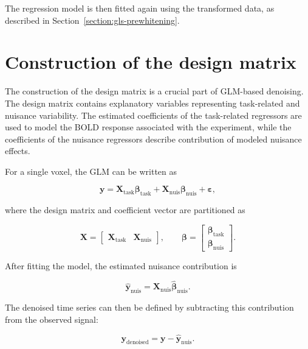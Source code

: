 \documentclass[english]{pwr_wmat_praca_dyplomowa}
\theoremstyle{definition}
\theoremstyle{remark}
\begin{document}
The regression model is then fitted again using the transformed data, as described in Section~\ref{section:gls-prewhitening}.


\section{Construction of the design matrix}
\label{section:design-matrix}

The construction of the design matrix is a crucial part of GLM-based denoising. The design matrix contains explanatory variables representing task-related and nuisance variability. The estimated coefficients of the task-related regressors are used to model the BOLD response associated with the experiment, while the coefficients of the nuisance regressors describe contribution of modeled nuisance effects.

For a single voxel, the GLM can be written as

\begin{equation}
    \mathbf{y} = \mathbf{X}_{\mathrm{task}} \boldsymbol{\beta}_{\mathrm{task}} + \mathbf{X}_{\mathrm{nuis}} \boldsymbol{\beta}_{\mathrm{nuis}} + \boldsymbol{\varepsilon},
\end{equation}

where the design matrix and coefficient vector are partitioned as

\begin{equation}
    \mathbf{X} =
    \begin{bmatrix}
        \mathbf{X}_{\mathrm{task}} & \mathbf{X}_{\mathrm{nuis}}
    \end{bmatrix},
    \qquad
    \boldsymbol{\beta} =
    \begin{bmatrix}
        \boldsymbol{\beta}_{\mathrm{task}} \\
        \boldsymbol{\beta}_{\mathrm{nuis}}
    \end{bmatrix}.
\end{equation}

After fitting the model, the estimated nuisance contribution is

\begin{equation}
    \widehat{\mathbf{y}}_{\mathrm{nuis}} = \mathbf{X}_{\mathrm{nuis}} \widehat{\boldsymbol{\beta}}_{\mathrm{nuis}}.
\end{equation}

The denoised time series can then be defined by subtracting this contribution from the observed signal:

\begin{equation}
    \mathbf{y}_{\mathrm{denoised}} = \mathbf{y} - \widehat{\mathbf{y}}_{\mathrm{nuis}}.
    \label{eq:glm-denoised-signal}
\end{equation}
\end{document}
